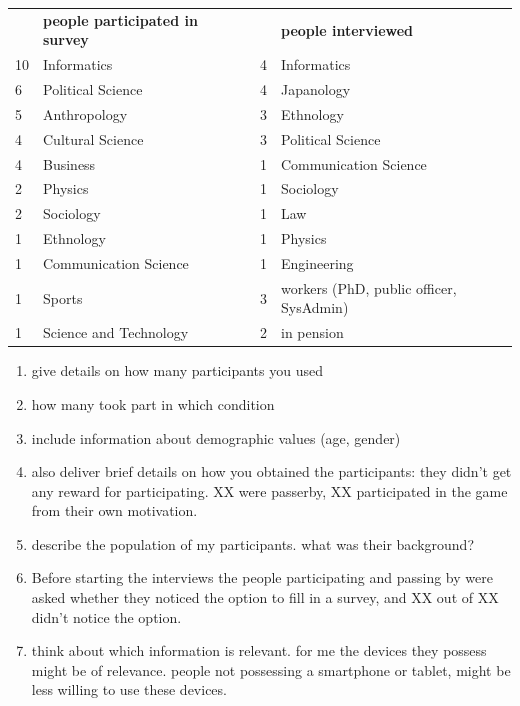 		\begin{table}[h]
		\begin{tabular}{lllll}
		   & \textbf{people participated in survey} &  &   & \textbf{people interviewed}             \\
		10 & Informatics                            &  & 4 & Informatics                             \\
		6  & Political Science                      &  & 4 & Japanology                              \\
		5  & Anthropology                           &  & 3 & Ethnology                               \\
		4  & Cultural Science                       &  & 3 & Political Science                       \\
		4  & Business                               &  & 1 & Communication Science                   \\
		2  & Physics                                &  & 1 & Sociology                               \\
		2  & Sociology                              &  & 1 & Law                                     \\
		1  & Ethnology                              &  & 1 & Physics                                 \\
		1  & Communication Science                  &  & 1 & Engineering                             \\
		1  & Sports                                 &  & 3 & workers (PhD, public officer, SysAdmin) \\
		1  & Science and Technology                 &  & 2 & in pension                             
		\end{tabular}
		\end{table}


		\begin{enumerate}
		\item give details on how many participants you used
		\item how many took part in which condition
		\item include information about demographic values (age, gender)
		\item also deliver brief details on how you obtained the participants: they didn't get any reward for participating. XX were passerby, XX participated in the game from their own motivation.
		\item describe the population of my participants. what was their background?
		\item  Before starting the interviews the people participating and passing by were asked whether they noticed the option to fill in a survey, and XX out of XX didn't notice the option. 
		\item think about which information is relevant. for me the devices they possess might be of relevance. people not possessing a smartphone or tablet, might be less willing to use these devices.  
		\end{enumerate}


